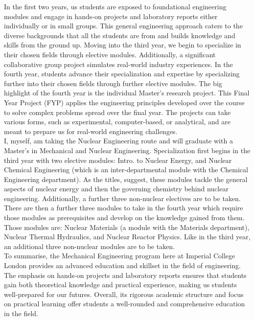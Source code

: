 \documentclass[8pt,a5paper]{article}
\begin{document}
In the first two years, us students are exposed to foundational engineering modules and engage in hands-on projects and laboratory reports either individually or in small groups. This general engineering approach caters to the diverse backgrounds that all the students are from and builds knowledge and skills from the ground up. Moving into the third year, we begin to specialize in their chosen fields through elective modules. Additionally, a significant collaborative group project simulates real-world industry experiences. In the fourth year, students advance their specialization and expertise by specializing further into their chosen fields through further elective modules. The big highlight of the fourth year is the individual Master's research project. This Final Year Project (FYP) applies the engineering principles developed over the course to solve complex problems spread over the final year. The projects can take various forms, such as experimental, computer-based, or analytical, and are meant to prepare us for real-world engineering challenges. \\

I, myself, am taking the Nuclear Engineering route and will graduate with a Master’s in Mechanical and Nuclear Engineering. Specialization first begins in the third year with two elective modules: Intro. to Nuclear Energy, and Nuclear Chemical Engineering (which is an inter-departmental module with the Chemical Engineering department). As the titles, suggest, these modules tackle the general aspects of nuclear energy and then the governing chemistry behind nuclear engineering. Additionally, a further three non-nuclear electives are to be taken. There are then a further three modules to take in the fourth year which require those modules as prerequisites and develop on the knowledge gained from them. Those modules are: Nuclear Materials (a module with the Materials department), Nuclear Thermal Hydraulics, and Nuclear Reactor Physics. Like in the third year, an additional three non-nuclear modules are to be taken.\\

To summarise, the Mechanical Engineering program here at Imperial College London provides an advanced education and skillset in the field of engineering. The emphasis on hands-on projects and laboratory reports ensures that students gain both theoretical knowledge and practical experience, making us students well-prepared for our futures. Overall, its rigorous academic structure and focus on practical learning offer students a well-rounded and comprehensive education in the field.
\end{document}
